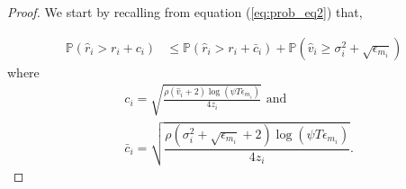 
\begin{proof}

We start by recalling from equation (\ref{eq:prob_eq2}) that,

\begin{align}
\mathbb{P}(\hat{r}_{i}> r_{i} + c_{i})
&\leq \mathbb{P}\left( \hat{r}_{i} > r_{i}+ \bar{c}_i\right) 
+ \mathbb{P}\left( \hat{v}_{i}\geq \sigma_{i}^{2}+\sqrt{\epsilon_{m_{i}}}\right)\label{eq:prob_eq3}
\end{align}
where 
\begin{align*}
&c_i =\sqrt{\frac{\rho (\hat{v}_i + 2)\log (\psi T\epsilon_{m_{i}})}{4 z_i}} \text{ and } \\
&\bar{c}_i=\sqrt{\dfrac{\rho (\sigma_{i}^{2}+\sqrt{\epsilon_{m_{i}}} + 2)\log(\psi T\epsilon_{m_{i}})}{4 z_i}}.
\end{align*}


\end{proof}
